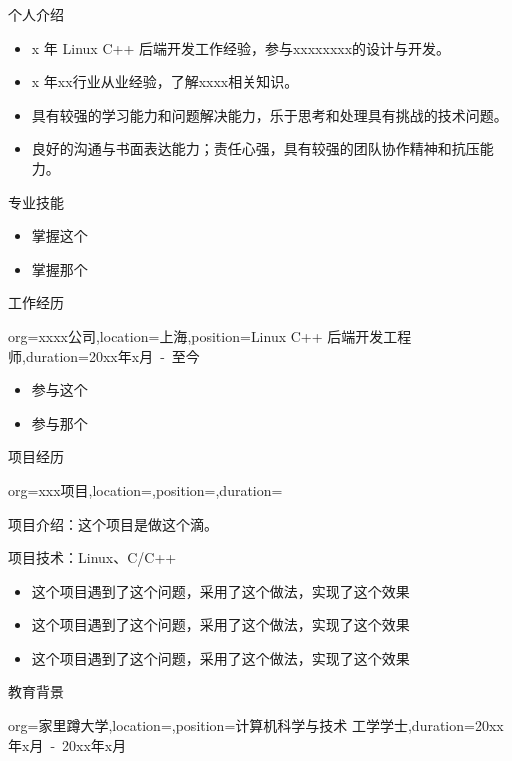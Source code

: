 \documentclass{resume}
\begin{document}
\makeheader

\begin{ResumeSection}{个人介绍}
    \smallskip
    \begin{itemize}
        \item {x 年 Linux C++ 后端开发工作经验，参与xxxxxxxx的设计与开发。}
        \item {x 年xx行业从业经验，了解xxxx相关知识。}
        \item {具有较强的学习能力和问题解决能力，乐于思考和处理具有挑战的技术问题。}
        \item {良好的沟通与书面表达能力；责任心强，具有较强的团队协作精神和抗压能力。}
    \end{itemize}
    \bigskip
\end{ResumeSection}

\begin{ResumeSection}{专业技能}
    \smallskip
    \begin{itemize}
        \item {掌握这个}
        \item {掌握那个}
    \end{itemize}
    \bigskip
\end{ResumeSection}

\begin{ResumeSection}{工作经历}
    \begin{ResumeSubsection}{org={xxxx公司},location={上海},position={Linux C++ 后端开发工程师},duration={20xx年x月\ -\ 至今}}
        \begin{itemize}
            \item {参与这个}
            \item {参与那个}
        \end{itemize}
    \end{ResumeSubsection}
\end{ResumeSection}

\begin{ResumeSection}{项目经历}
    \begin{ResumeSubsection}{org={xxx项目},location={},position={},duration={}}
        \par\normalsize{项目介绍：}{这个项目是做这个滴。}
        \par\normalsize{项目技术：}{Linux、C/C++}
        \begin{itemize}
            \item {这个项目遇到了这个问题，采用了这个做法，实现了这个效果}
            \item {这个项目遇到了这个问题，采用了这个做法，实现了这个效果}
            \item {这个项目遇到了这个问题，采用了这个做法，实现了这个效果}
        \end{itemize}
    \end{ResumeSubsection}
\end{ResumeSection}

\begin{ResumeSection}{教育背景}
    \begin{ResumeSubsection}{org={家里蹲大学},location={},position={计算机科学与技术 \qquad 工学学士},duration={20xx年x月\ -\ 20xx年x月}}
    \end{ResumeSubsection}
\end{ResumeSection}
\end{document}
